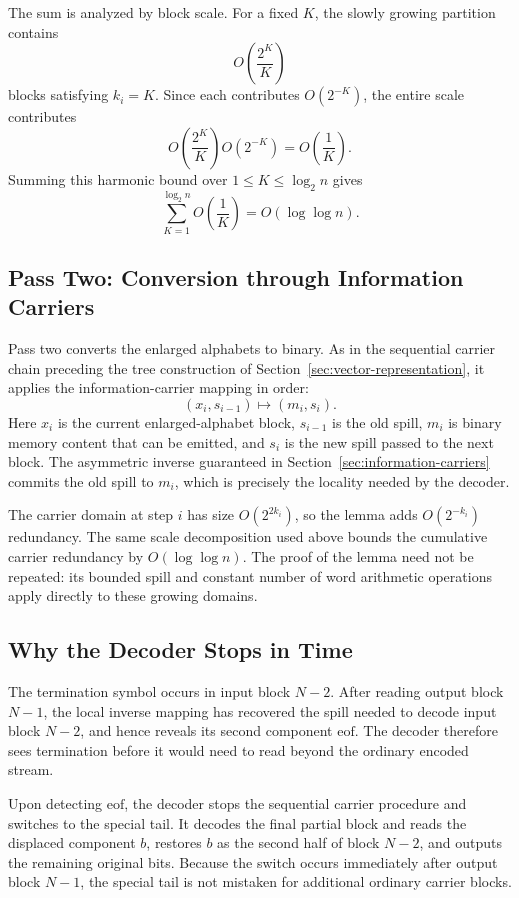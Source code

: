 The sum is analyzed by block scale. For a fixed \(K\), the slowly growing
partition contains
\[
    O\left(\frac{2^K}{K}\right)
\]
blocks satisfying \(k_i=K\). Since each contributes \(O(2^{-K})\), the
entire scale contributes
\[
    O\left(\frac{2^K}{K}\right)O(2^{-K})
    =O\left(\frac{1}{K}\right).
\]
Summing this harmonic bound over \(1\leq K\leq\log_2n\) gives
\[
    \sum_{K=1}^{\log_2 n}O\left(\frac{1}{K}\right)
    =O(\log\log n).
\]

\subsection{Pass Two: Conversion through Information Carriers}

Pass two converts the enlarged alphabets to binary. As in the sequential
carrier chain preceding the tree construction of
Section~\ref{sec:vector-representation}, it applies the information-carrier
mapping in order:
\[
    (x_i,s_{i-1})\longmapsto(m_i,s_i).
\]
Here \(x_i\) is the current enlarged-alphabet block, \(s_{i-1}\) is the old
spill, \(m_i\) is binary memory content that can be emitted, and \(s_i\) is
the new spill passed to the next block. The asymmetric inverse guaranteed in
Section~\ref{sec:information-carriers} commits the old spill to \(m_i\),
which is precisely the locality needed by the decoder.

The carrier domain at step \(i\) has size \(O(2^{2k_i})\), so the lemma adds
\(O(2^{-k_i})\) redundancy. The same scale decomposition used above bounds
the cumulative carrier redundancy by \(O(\log\log n)\). The proof of the
lemma need not be repeated: its bounded spill and constant number of word
arithmetic operations apply directly to these growing domains.

\subsection{Why the Decoder Stops in Time}

The termination symbol occurs in input block \(N-2\). After reading output
block \(N-1\), the local inverse mapping has recovered the spill needed to
decode input block \(N-2\), and hence reveals its second component
\(\mathrm{eof}\). The decoder therefore sees termination before it would
need to read beyond the ordinary encoded stream.

Upon detecting \(\mathrm{eof}\), the decoder stops the sequential carrier
procedure and switches to the special tail. It decodes the final partial
block and reads the displaced component \(b\), restores \(b\) as the second
half of block \(N-2\), and outputs the remaining original bits. Because the
switch occurs immediately after output block \(N-1\), the special tail is
not mistaken for additional ordinary carrier blocks.

